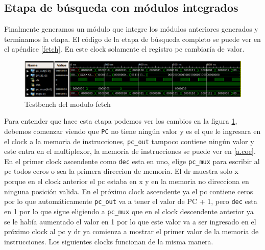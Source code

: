 \subsection{Etapa de búsqueda con módulos integrados}
Finalmente generamos un m\'odulo que integre los módulos anteriores generados y terminamos la etapa. El código de la etapa de búsqueda completo se puede ver en el apéndice \ref{fetch}. En este clock solamente el registro \ac{pc} cambiaría de valor. 

\begin{figure}[H]
\centering
\includegraphics[scale=0.45]{Capitulo01/fetch_test}
\caption{Testbench del modulo fetch}
\label{fig:fetcht}
\end{figure}

Para entender que hace esta etapa podemos ver los cambios en la figura \ref{fig:fetcht}, debemos comenzar viendo que \texttt{PC} no tiene ningún valor y es el que le ingresara en el clock a la memoria de instrucciones, \texttt{pc\_out} tampoco contiene ningún valor y este entra en el multiplexor, la memoria de instrucciones se puede ver en \ref{a.coe}.  
En el primer clock ascendente como \texttt{dec} esta en uno, elige \texttt{pc\_mux} para escribir al \ac{pc} todos ceros o sea la primera direccion de memoria. El \ac{dr}  muestra  solo x porque en el clock anterior el \ac{pc} estaba en x y en la memoria no direcciona en ninguna posición valida. En el próximo clock ascendente ya el \ac{pc} contiene ceros por lo que automáticamente \texttt{pc\_out} va a tener el valor de \ac{PC} + 1, pero \texttt{dec} esta en 1 por lo que sigue eligiendo a \texttt{pc\_mux} que en el clock descendente anterior ya se le había aumentado el valor en 1 por lo que este valor va a ser ingresado en el próximo clock al \ac{pc} y \ac{dr} ya comienza a mostrar el primer valor de la memoria de instrucciones. Los siguientes clocks funcionan de la misma manera.

